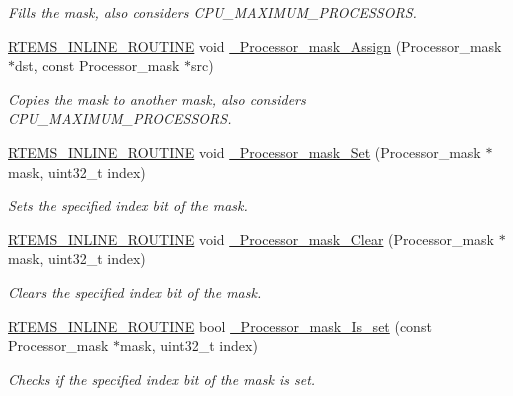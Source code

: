 \begin{DoxyCompactItemize}
\begin{DoxyCompactList}\small\item\em Fills the mask, also considers C\+P\+U\+\_\+\+M\+A\+X\+I\+M\+U\+M\+\_\+\+P\+R\+O\+C\+E\+S\+S\+O\+RS. \end{DoxyCompactList}\item 
\mbox{\hyperlink{group__RTEMSScoreBaseDefs_gac216239df231d5dbd15e3520b0b9313f}{R\+T\+E\+M\+S\+\_\+\+I\+N\+L\+I\+N\+E\+\_\+\+R\+O\+U\+T\+I\+NE}} void \mbox{\hyperlink{group__RTEMSScoreProcessorMask_ga44210476e62cb94198e85af321c2f266}{\+\_\+\+Processor\+\_\+mask\+\_\+\+Assign}} (Processor\+\_\+mask $\ast$dst, const Processor\+\_\+mask $\ast$src)
\begin{DoxyCompactList}\small\item\em Copies the mask to another mask, also considers C\+P\+U\+\_\+\+M\+A\+X\+I\+M\+U\+M\+\_\+\+P\+R\+O\+C\+E\+S\+S\+O\+RS. \end{DoxyCompactList}\item 
\mbox{\hyperlink{group__RTEMSScoreBaseDefs_gac216239df231d5dbd15e3520b0b9313f}{R\+T\+E\+M\+S\+\_\+\+I\+N\+L\+I\+N\+E\+\_\+\+R\+O\+U\+T\+I\+NE}} void \mbox{\hyperlink{group__RTEMSScoreProcessorMask_gacaad134d2fab65591b0d17db979fba88}{\+\_\+\+Processor\+\_\+mask\+\_\+\+Set}} (Processor\+\_\+mask $\ast$mask, uint32\+\_\+t index)
\begin{DoxyCompactList}\small\item\em Sets the specified index bit of the mask. \end{DoxyCompactList}\item 
\mbox{\hyperlink{group__RTEMSScoreBaseDefs_gac216239df231d5dbd15e3520b0b9313f}{R\+T\+E\+M\+S\+\_\+\+I\+N\+L\+I\+N\+E\+\_\+\+R\+O\+U\+T\+I\+NE}} void \mbox{\hyperlink{group__RTEMSScoreProcessorMask_ga8168d6dfc61eba95df1afe7e5188e35a}{\+\_\+\+Processor\+\_\+mask\+\_\+\+Clear}} (Processor\+\_\+mask $\ast$mask, uint32\+\_\+t index)
\begin{DoxyCompactList}\small\item\em Clears the specified index bit of the mask. \end{DoxyCompactList}\item 
\mbox{\hyperlink{group__RTEMSScoreBaseDefs_gac216239df231d5dbd15e3520b0b9313f}{R\+T\+E\+M\+S\+\_\+\+I\+N\+L\+I\+N\+E\+\_\+\+R\+O\+U\+T\+I\+NE}} bool \mbox{\hyperlink{group__RTEMSScoreProcessorMask_gad1e2196314931028e20fbaa5b0e4e995}{\+\_\+\+Processor\+\_\+mask\+\_\+\+Is\+\_\+set}} (const Processor\+\_\+mask $\ast$mask, uint32\+\_\+t index)
\begin{DoxyCompactList}\small\item\em Checks if the specified index bit of the mask is set. \end{DoxyCompactList}\item 

\end{DoxyCompactItemize}
